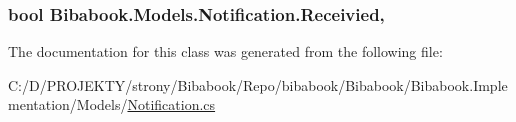 \subsubsection[{Receivied}]{\setlength{\rightskip}{0pt plus 5cm}bool Bibabook.\+Models.\+Notification.\+Receivied\hspace{0.3cm}{\ttfamily [get]}, {\ttfamily [set]}}\label{class_bibabook_1_1_models_1_1_notification_aac5ee5b41e74b1e70149b6605de8880c}


The documentation for this class was generated from the following file\+:\begin{DoxyCompactItemize}
\item 
C\+:/\+D/\+P\+R\+O\+J\+E\+K\+T\+Y/strony/\+Bibabook/\+Repo/bibabook/\+Bibabook/\+Bibabook.\+Implementation/\+Models/\hyperlink{_notification_8cs}{Notification.\+cs}\end{DoxyCompactItemize}

